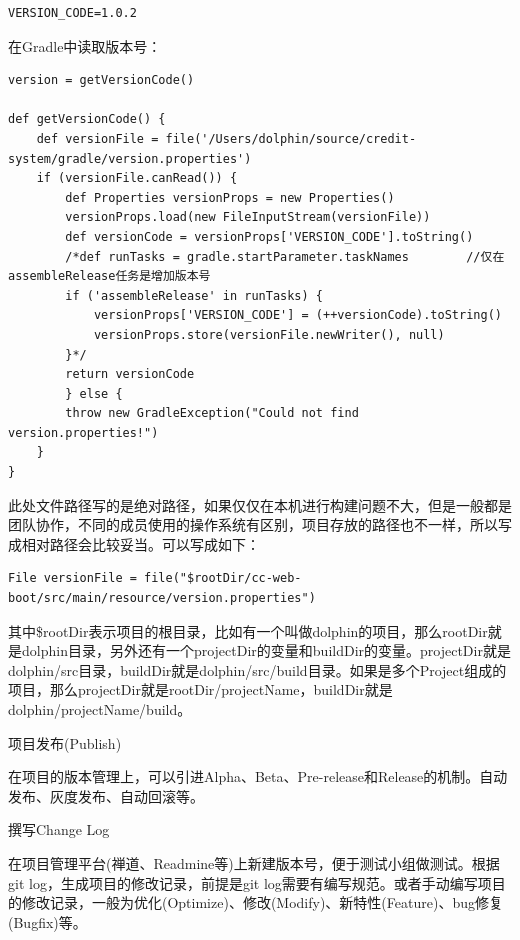 \documentclass[12pt]{book}
\makeatletter
\numberwithin{dummy}{section}
\theoremstyle{ocrenumbox}
\theoremstyle{blacknumex}
\theoremstyle{blacknumbox}
\theoremstyle{ocrenum}
\renewcommand{\subsection}{\@startsection {subsection}{2}{\z@}
	{-3ex \@plus -0.1ex \@minus -.4ex}
	{0.5ex \@plus.2ex }
	{\normalfont\sffamily\bfseries}}
\renewcommand\paragraph{\@startsection{paragraph}{4}{\z@}
	{-2ex \@plus-.2ex \@minus .2ex}
	{.1ex}
	{\normalfont\small\sffamily\bfseries}}
\makeatother
\begin{document}
\begin{lstlisting}
VERSION_CODE=1.0.2
\end{lstlisting}

在Gradle中读取版本号：

\begin{lstlisting}
version = getVersionCode()

def getVersionCode() {
	def versionFile = file('/Users/dolphin/source/credit-system/gradle/version.properties')
	if (versionFile.canRead()) {
		def Properties versionProps = new Properties()
		versionProps.load(new FileInputStream(versionFile))
		def versionCode = versionProps['VERSION_CODE'].toString()
		/*def runTasks = gradle.startParameter.taskNames        //仅在assembleRelease任务是增加版本号
		if ('assembleRelease' in runTasks) {
			versionProps['VERSION_CODE'] = (++versionCode).toString()
			versionProps.store(versionFile.newWriter(), null)
		}*/
		return versionCode
		} else {
		throw new GradleException("Could not find version.properties!")
	}
}
\end{lstlisting}

此处文件路径写的是绝对路径，如果仅仅在本机进行构建问题不大，但是一般都是团队协作，不同的成员使用的操作系统有区别，项目存放的路径也不一样，所以写成相对路径会比较妥当。可以写成如下：

\begin{lstlisting}
File versionFile = file("$rootDir/cc-web-boot/src/main/resource/version.properties")
\end{lstlisting}

其中\$rootDir表示项目的根目录，比如有一个叫做dolphin的项目，那么rootDir就是dolphin目录，另外还有一个projectDir的变量和buildDir的变量。projectDir就是dolphin/src目录，buildDir就是dolphin/src/build目录。如果是多个Project组成的项目，那么projectDir就是rootDir/projectName，buildDir就是dolphin/projectName/build。

\subsection{项目发布(Publish)}

在项目的版本管理上，可以引进Alpha、Beta、Pre-release和Release的机制。自动发布、灰度发布、自动回滚等。

\paragraph{撰写Change Log}

在项目管理平台(禅道、Readmine等)上新建版本号，便于测试小组做测试。根据git log，生成项目的修改记录，前提是git log需要有编写规范。或者手动编写项目的修改记录，一般为优化(Optimize)、修改(Modify)、新特性(Feature)、bug修复(Bugfix)等。
\end{document}
